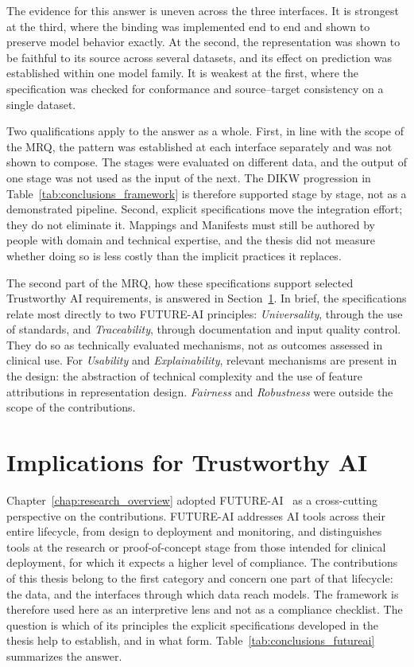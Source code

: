 The evidence for this answer is uneven across the three interfaces. It is strongest at the third, where the binding was implemented end to end and shown to preserve model behavior exactly. At the second, the representation was shown to be faithful to its source across several datasets, and its effect on prediction was established within one model family. It is weakest at the first, where the specification was checked for conformance and source--target consistency on a single dataset.

Two qualifications apply to the answer as a whole. First, in line with the scope of the MRQ, the pattern was established at each interface separately and was not shown to compose. The stages were evaluated on different data, and the output of one stage was not used as the input of the next. The DIKW progression in Table~\ref{tab:conclusions_framework} is therefore supported stage by stage, not as a demonstrated pipeline. Second, explicit specifications move the integration effort; they do not eliminate it. Mappings and Manifests must still be authored by people with domain and technical expertise, and the thesis did not measure whether doing so is less costly than the implicit practices it replaces.

The second part of the MRQ, how these specifications support selected Trustworthy AI requirements, is answered in Section~\ref{sec:conclusions_trustworthy}. In brief, the specifications relate most directly to two FUTURE-AI principles: \emph{Universality}, through the use of standards, and \emph{Traceability}, through documentation and input quality control. They do so as technically evaluated mechanisms, not as outcomes assessed in clinical use. For \emph{Usability} and \emph{Explainability}, relevant mechanisms are present in the design: the abstraction of technical complexity and the use of feature attributions in representation design. \emph{Fairness} and \emph{Robustness} were outside the scope of the contributions.

\section{Implications for Trustworthy AI}
\label{sec:conclusions_trustworthy}

Chapter~\ref{chap:research_overview} adopted FUTURE-AI~\cite{lekadir_future-ai_2025} as a cross-cutting perspective on the contributions. FUTURE-AI addresses AI tools across their entire lifecycle, from design to deployment and monitoring, and distinguishes tools at the research or proof-of-concept stage from those intended for clinical deployment, for which it expects a higher level of compliance. The contributions of this thesis belong to the first category and concern one part of that lifecycle: the data, and the interfaces through which data reach models. The framework is therefore used here as an interpretive lens and not as a compliance checklist. The question is which of its principles the explicit specifications developed in the thesis help to establish, and in what form. Table~\ref{tab:conclusions_futureai} summarizes the answer.

